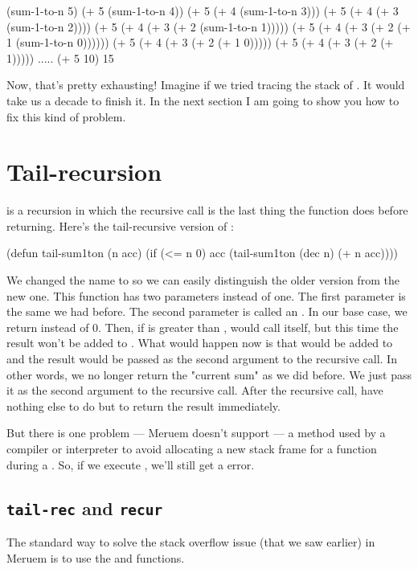 \begin{REPL}
(sum-1-to-n 5)
(+ 5 (sum-1-to-n 4))
(+ 5 (+ 4 (sum-1-to-n 3)))
(+ 5 (+ 4 (+ 3 (sum-1-to-n 2))))
(+ 5 (+ 4 (+ 3 (+ 2 (sum-1-to-n 1)))))
(+ 5 (+ 4 (+ 3 (+ 2 (+ 1 (sum-1-to-n 0))))))
(+ 5 (+ 4 (+ 3 (+ 2 (+ 1 0)))))
(+ 5 (+ 4 (+ 3 (+ 2 (+ 1)))))
.....
(+ 5 10)
15
\end{REPL}

Now, that's pretty exhausting! Imagine if we tried tracing the stack of . It would take us a decade to finish it. In the next section I am going to show you how to fix this kind of problem.

\section{Tail-recursion}
 is a recursion in which the recursive call is the last thing the function does before returning. Here's the tail-recursive version of :

\begin{Meruem}
(defun tail-sum1ton (n acc)
  (if (<= n 0)
    acc
    (tail-sum1ton (dec n) (+ n acc))))
\end{Meruem}

We changed the name to  so we can easily distinguish the older version from the new one. This function has two parameters instead of one. The first parameter is the same  we had before. The second parameter is called an . In our base case, we return  instead of 0. Then, if  is greater than ,  would call itself, but this time the result won't be added to . What would happen now is that  would be added to  and the result would be passed as the second argument to the recursive call. In other words, we no longer return the "current sum" as we did before. We just pass it as the second argument to the recursive call. After the recursive call,  have nothing else to do but to return the result immediately. 

But there is one problem --- Meruem doesn't support  --- a method used by a compiler or interpreter to avoid allocating a new stack frame for a function during a . So, if we execute , we'll still get a  error.

\subsection{\texttt{tail-rec} and \texttt{recur}}
The standard way to solve the stack overflow issue (that we saw earlier) in Meruem is to use the  and  functions.


